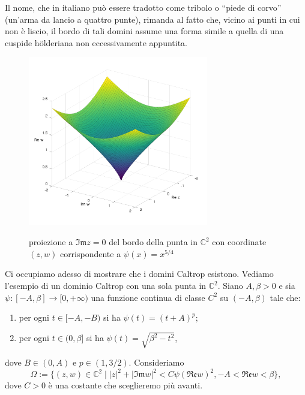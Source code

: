 \begin{oss} \label{cuspidiii}
    Il nome, che in italiano può essere tradotto come tribolo o ``piede di corvo'' (un'arma da lancio a quattro punte), rimanda al fatto che, vicino ai punti in cui non è liscio, il bordo di tali domini assume una forma simile a quella di una cuspide hölderiana non eccessivamente appuntita.
\end{oss}

\begin{figure}[h!]
    \begin{center}
        \includegraphics[width=0.7\textwidth, trim=0 4cm 0 2.5cm]{Immagini/caltrop.png} \\
        \caption{proiezione a $\mathfrak{Im}z=0$ del bordo della punta in $\mathbb{C}^2$ con coordinate $(z,w)$ corrispondente a $\psi(x)=x^{5/4}$}
    \end{center}
\end{figure}

Ci occupiamo adesso di mostrare che i domini Caltrop esistono. Vediamo l'esempio di un dominio Caltrop con una sola punta in $\mathbb{C}^2$. Siano $A,\beta>0$ e sia $\psi:[-A,\beta]\longrightarrow[0,+\infty)$ una funzione continua di classe $C^2$ su $(-A,\beta)$ tale che:
\begin{enumerate}[label={(\arabic*)}]
    \item per ogni $t\in[-A,-B)$ si ha $\psi(t)=(t+A)^p$;
    \item per ogni $t\in(0,\beta]$ si ha $\psi(t)=\sqrt{\beta^2-t^2}$,
\end{enumerate}
dove $B\in(0,A)$ e $p\in(1,3/2)$. Consideriamo
$$\Omega:=\{(z,w)\in\mathbb{C}^2\mid |z|^2+|\mathfrak{Im}w|^2<C\psi(\mathfrak{Re}w)^2,-A<\mathfrak{Re}w<\beta\},$$
dove $C>0$ è una costante che sceglieremo più avanti.

